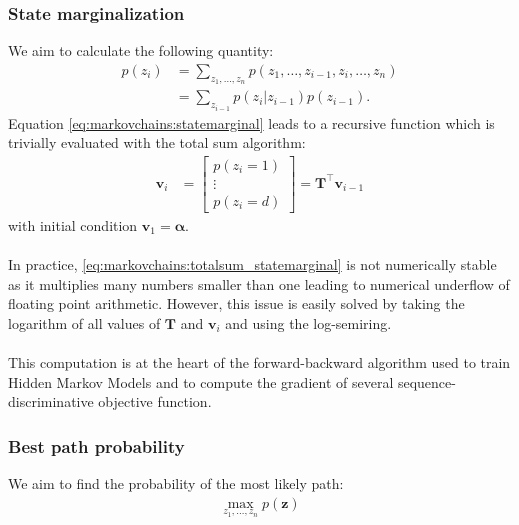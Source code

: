 \subsubsection{State marginalization}
We aim to calculate the following
quantity:
\begin{align}
    p(z_i) &= \sum_{z_1, \dots, z_{n}} p(z_1, \dots, z_{i-1}, z_i, \dots, z_n) \\
    &= \sum_{z_{i-1}} p(z_i | z_{i-1}) p(z_{i-1}).
    \label{eq:markovchains:statemarginal}
\end{align}
Equation \ref{eq:markovchains:statemarginal} leads to a recursive
function which is trivially evaluated with the total sum algorithm:
\begin{align}
    \mathbf{v}_i &= \begin{bmatrix}
        p(z_i = 1) \\
        \vdots \\
        p(z_i = d)
    \end{bmatrix} = \mathbf{T}^\top \mathbf{v}_{i-1}
    \label{eq:markovchains:totalsum_statemarginal}
\end{align}
with initial condition $\mathbf{v}_1 = \boldsymbol{\alpha}$.

\paragraph{} In practice, \eqref{eq:markovchains:totalsum_statemarginal} is not
numerically stable as it multiplies many numbers smaller than one
leading to numerical underflow  of floating point arithmetic. However,
this issue is easily solved by taking the logarithm of all values of
$\mathbf{T}$  and $\mathbf{v}_i$ and using the log-semiring.

\paragraph{} This computation is at the heart of the forward-backward algorithm
used to train Hidden Markov Models and to compute the gradient of
several sequence-discriminative objective function.

\subsubsection{Best path probability}

We aim to find the probability of the most likely path:
\begin{align}
    \max_{z_1, \dots, z_{n}} p(\mathbf{z})
\end{align}

